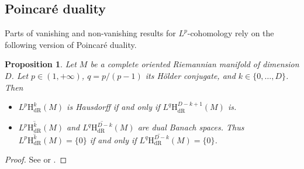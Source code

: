 \documentclass[JEP,XML,SOM,Unicode,published]{cedram}
\newcommand{\dR}{\mathrm{dR}}
\newcommand{\rH}{\mathrm{H}}
\theoremstyle{plain}
\newtheorem{proposition}[equation]{Proposition}
\theoremstyle{remark}
\theoremstyle{definition}
\begin{document}
\subsection{Poincaré duality} Parts of vanishing and non-vanishing results for $L^p$\nobreakdash-coho\-mo\-logy
rely on the following version of Poincaré duality.

\begin{proposition}\label{poincare-proposition} Let $M$ be a complete oriented Riemannian manifold of dimension $D$.
Let $p \in (1, +\infty)$, $q = p/(p-1)$ its Hölder conjugate, and $k \in \{0, \dots, D\}$. Then
\begin{itemize}
\item $L^p \rH_\dR^k (M)$ is Hausdorff if and only if $L^q \rH_\dR^{D-k +1} (M)$ is.
\item $L^p \overline{\rH^k_\dR} (M)$ and $L^q \overline{\rH^{D-k}_\dR} (M)$ are dual Banach spaces.
Thus $L^p \overline{\rH^k_\dR} (M) = \{0\}$ if and only if $L^q \overline{\rH^{D-k}_\dR} (M) = \{0\}$.
\end{itemize}
\end{proposition}
\begin{proof} See \cite[Cor.\,14]{P1} or \cite{GT10}.
\end{proof}
\end{document}
